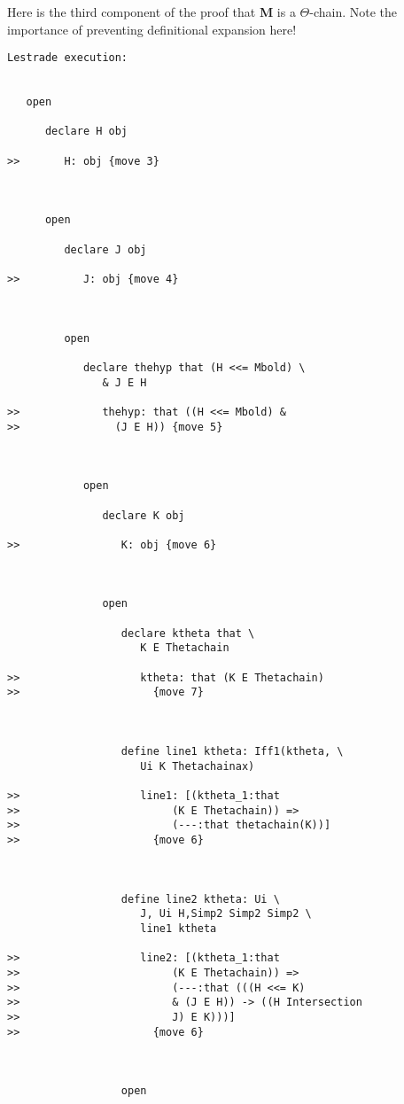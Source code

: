 \documentclass[12pt]{article}
\begin{document}
Here is the third component of the proof that {\bf M} is a $\Theta$-chain.  Note the importance of preventing definitional expansion here!

\begin{verbatim}Lestrade execution:


   open

      declare H obj

>>       H: obj {move 3}



      open

         declare J obj

>>          J: obj {move 4}



         open

            declare thehyp that (H <<= Mbold) \
               & J E H

>>             thehyp: that ((H <<= Mbold) &
>>               (J E H)) {move 5}



            open

               declare K obj

>>                K: obj {move 6}



               open

                  declare ktheta that \
                     K E Thetachain

>>                   ktheta: that (K E Thetachain)
>>                     {move 7}



                  define line1 ktheta: Iff1(ktheta, \
                     Ui K Thetachainax)

>>                   line1: [(ktheta_1:that
>>                        (K E Thetachain)) =>
>>                        (---:that thetachain(K))]
>>                     {move 6}



                  define line2 ktheta: Ui \
                     J, Ui H,Simp2 Simp2 Simp2 \
                     line1 ktheta

>>                   line2: [(ktheta_1:that
>>                        (K E Thetachain)) =>
>>                        (---:that (((H <<= K)
>>                        & (J E H)) -> ((H Intersection
>>                        J) E K)))]
>>                     {move 6}



                  open


\end{verbatim}
\end{document}

